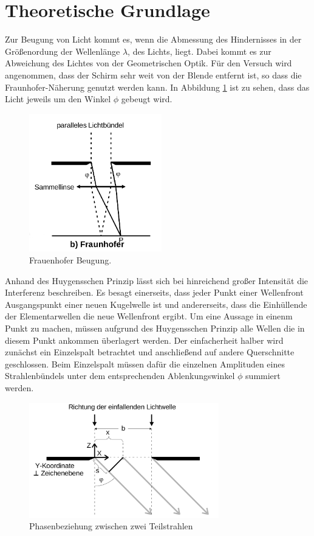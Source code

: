 \section{Theoretische Grundlage}
\label{sec:Theorie}
Zur Beugung von Licht kommt es, wenn die Abmessung des Hindernisses in der Größenordung der Wellenlänge $\lambda$, des Lichts, liegt. Dabei kommt es zur Abweichung des Lichtes von der Geometrischen Optik. Für den Versuch wird angenommen, dass der Schirm sehr weit von der Blende entfernt ist, so dass die Fraunhofer-Näherung genutzt werden kann. In Abbildung \ref{fig:Fra} ist zu sehen, dass das Licht jeweils um den Winkel $\phi$ gebeugt wird.
\begin{figure}
  \centering
  \includegraphics[height=6cm]{picture/Frauenhofer.png}
  \caption{Frauenhofer Beugung. \cite[1]{sample}}
  \label{fig:Fra}
\end{figure}
Anhand des Huygensschen Prinzip lässt sich bei hinreichend großer Intensität die Interferenz beschreiben. Es besagt einerseits, dass jeder Punkt einer Wellenfront Ausgangspunkt einer neuen Kugelwelle ist und andererseits, dass die Einhüllende der Elementarwellen die neue Wellenfront ergibt. Um eine Aussage in einenm Punkt zu machen, müssen aufgrund des Huygensschen Prinzip alle Wellen die in diesem Punkt ankommen überlagert werden. Der einfacherheit halber wird zunächst ein Einzelspalt betrachtet und anschließend auf andere Querschnitte geschlossen. Beim Einzelspalt müssen dafür die einzelnen Amplituden eines Strahlenbündels unter dem entsprechenden Ablenkungswinkel $\phi$ summiert werden.
\begin{figure}
  \centering
  \includegraphics[height=5cm]{picture/doppelspalt.png}
  \caption{Phasenbeziehung zwischen zwei Teilstrahlen}
  \label{fig:dop}
\end{figure}
